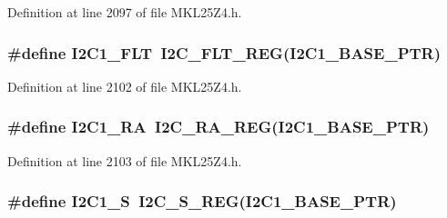 Definition at line 2097 of file M\+K\+L25\+Z4.\+h.

\subsubsection[{\texorpdfstring{I2\+C1\+\_\+\+F\+LT}{I2C1_FLT}}]{\setlength{\rightskip}{0pt plus 5cm}\#define I2\+C1\+\_\+\+F\+LT~{\bf I2\+C\+\_\+\+F\+L\+T\+\_\+\+R\+EG}({\bf I2\+C1\+\_\+\+B\+A\+S\+E\+\_\+\+P\+TR})}\hypertarget{group___i2_c___register___accessor___macros_gaddb39b793fc611a3fd107eaf33c26598}{}\label{group___i2_c___register___accessor___macros_gaddb39b793fc611a3fd107eaf33c26598}


Definition at line 2102 of file M\+K\+L25\+Z4.\+h.

\subsubsection[{\texorpdfstring{I2\+C1\+\_\+\+RA}{I2C1_RA}}]{\setlength{\rightskip}{0pt plus 5cm}\#define I2\+C1\+\_\+\+RA~{\bf I2\+C\+\_\+\+R\+A\+\_\+\+R\+EG}({\bf I2\+C1\+\_\+\+B\+A\+S\+E\+\_\+\+P\+TR})}\hypertarget{group___i2_c___register___accessor___macros_ga15eb9a112bb86d26c32d17ebfb3dcecc}{}\label{group___i2_c___register___accessor___macros_ga15eb9a112bb86d26c32d17ebfb3dcecc}


Definition at line 2103 of file M\+K\+L25\+Z4.\+h.

\subsubsection[{\texorpdfstring{I2\+C1\+\_\+S}{I2C1_S}}]{\setlength{\rightskip}{0pt plus 5cm}\#define I2\+C1\+\_\+S~{\bf I2\+C\+\_\+\+S\+\_\+\+R\+EG}({\bf I2\+C1\+\_\+\+B\+A\+S\+E\+\_\+\+P\+TR})}\hypertarget{group___i2_c___register___accessor___macros_gae095b0f00b8617e16ee1a798d8a07e19}{}\label{group___i2_c___register___accessor___macros_gae095b0f00b8617e16ee1a798d8a07e19}


